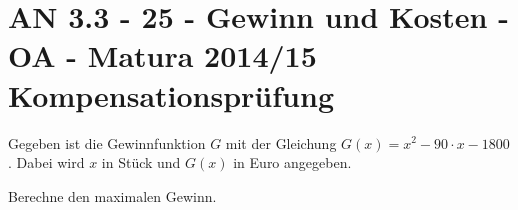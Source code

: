 \section{AN 3.3 - 25 - Gewinn und Kosten - OA - Matura 2014/15 Kompensationsprüfung}

\begin{beispiel}[AN 3.3]{1} %
				Gegeben ist die Gewinnfunktion $G$ mit der Gleichung $G(x)=x^2-90\cdot x-1800$. Dabei wird $x$ in Stück und $G(x)$ in Euro angegeben.
				
				Berechne den maximalen Gewinn.
				
\end{beispiel}